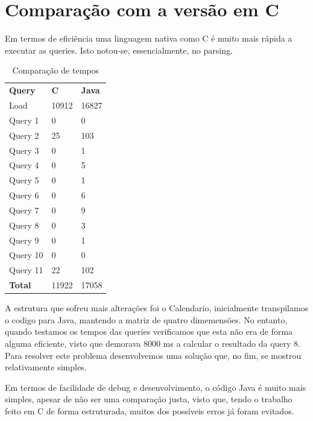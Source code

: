 \documentclass[10pt,a4paper]{report}
\begin{document}
\chapter{Comparação com a versão em C}
    Em termos de eficiência uma linguagem nativa como C é muito mais rápida a
    executar as queries. Isto notou-se, essencialmente, no parsing.
    \begin{table}[h]
        \centering
        \caption{Comparação de tempos}
        \label{my-label}
        \begin{tabular}{lll}
        \textbf{Query}    & \textbf{C} & \textbf{Java}  \\
        Load              & 10912      & 16827 \\
        Query 1           & 0          & 0     \\
        Query 2           & 25         & 103   \\
        Query 3           & 0          & 1     \\
        Query 4           & 0          & 5     \\
        Query 5           & 0          & 1     \\
        Query 6           & 0          & 6     \\
        Query 7           & 0          & 9     \\
        Query 8           & 0          & 3     \\
        Query 9           & 0          & 1     \\
        Query 10          & 0          & 0     \\
        Query 11          & 22         & 102   \\
        \textbf{Total}    & 11922      & 17058
        \end{tabular}
    \end{table}

    A estrutura que sofreu mais alterações foi o Calendario, inicialmente
    transpilamos o codigo para Java, mantendo a matriz de quatro dimemensões.
    No entanto, quando testamos os tempos das queries verificamos que esta
    não era de forma alguma eficiente, visto que demorava 8000 ms a calcular
    o resultado da query 8. Para resolver este problema desenvolvemos uma
    solução que, no fim, se mostrou relativamente simples.

    Em termos de facilidade de debug e desenvolvimento, o código Java é muito
    mais simples, apesar de não ser uma comparação justa, visto que, tendo o
    trabalho feito em C de forma estruturada, muitos dos possíveis erros já
    foram evitados.
\end{document}
